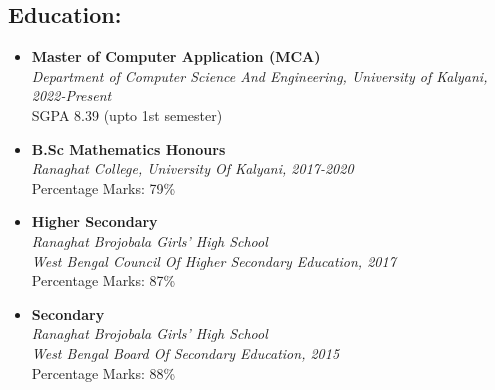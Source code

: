 \documentclass[a4paper, 11pt]{article}
\begin{document}
\begin{tcolorbox}
\begin{minipage}[t]{10cm}
\begin{tcolorbox}[grow to right by=0.5cm, colframe=white, colback=white]
                \section*{Education:}
                    \begin{itemize}
                        \item {
                            \textbf{Master of Computer Application (MCA)} \\
                            \emph{Department of Computer Science And Engineering, University of Kalyani, 2022-Present} \\
                            SGPA 8.39 (upto 1st semester)
                        }
                        \item {
                            \textbf{B.Sc Mathematics Honours}\\
                            \emph{Ranaghat College, University Of Kalyani, 2017-2020}\\
                            Percentage Marks: 79\%
                        }
                        \item {
                            \textbf{Higher Secondary}\\
                            \emph{Ranaghat Brojobala Girls' High School}\\
                            \emph{West Bengal Council Of Higher Secondary Education, 2017}\\
                            Percentage Marks: 87\%
                        }
                        \item {
                            \textbf{Secondary}\\
                            \emph{Ranaghat Brojobala Girls' High School}\\
                            \emph{West Bengal Board Of Secondary Education, 2015}\\
                            Percentage Marks: 88\%
                        }    
                    \end{itemize}
                    

\end{tcolorbox}
\end{minipage}
\end{tcolorbox}
\end{document}
